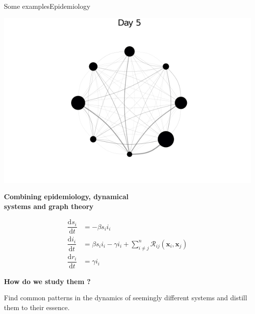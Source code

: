 \documentclass[usenames,dvipsnames,svgnames,10pt,aspectratio=169]{beamer}
\begin{document}
\begin{frame}[t, c]{Some examples}{Epidemiology}
  \begin{minipage}{.58\textwidth}
    \centering
    \includegraphics[width=\textwidth]{covid}

    \textbf{Combining epidemiology, dynamical \\ systems and graph theory}
  \end{minipage}%
  \hfill
  \begin{minipage}{.38\textwidth}
    \[
    \begin{aligned}
      \dfrac{\mathrm{d}s_i}{\mathrm{d}t} & = - \beta s_i i_i  \\
      \dfrac{\mathrm{d}i_i}{\mathrm{d}t} & = \beta s_i i_i - \gamma i_i + \sum_{i \neq j}^n \mathcal{R}_{ij}(\bm{x}_i, \bm{x}_j) \\
      \dfrac{\mathrm{d}r_i}{\mathrm{d}t} & = \gamma i_i
    \end{aligned}
    \]
  \end{minipage}

  \vspace{1cm}
\end{frame}

\begin{frame}[t, c]{}{}
  \begin{block}{\centering \textbf{How do we study them ?}}
    \bigskip

    \centering

    Find common patterns in the dynamics of seemingly different systems and distill them to their essence.

  \end{block}
\end{frame}
\end{document}
